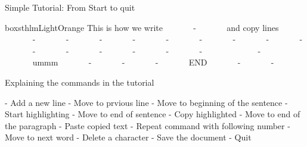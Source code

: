 \documentclass[newPxFont,sthlmFooter,nooffset]{beamer}
\begin{document}
\begin{frame}[containsverbatim,t]{Simple Tutorial: From Start to quit}
\begin{beamercolorbox}[sep=1em,wd=\linewidth]{boxsthlmLightOrange}
{\footnotesize
This is how we write \hfill ~~~~~~ - \hfill~~~~~~  and copy lines \hfill ~~~~~~ - \hfill~~~~~~  -  \hfill~~~~~~   - \hfill~~~~~~    - \hfill~~~~~~    - \hfill~~~~~~    -\keystroke{\}} \hfill~~~~~~    - \hfill~~~~~~    - \hfill~~~~~~    - \hfill~~~~~~    - \hfill~~~~~~    - \hfill~~~~~~   -  \hfill~~~~~~   - \hfill ~~~~~~   -  \hfill~~~~~~   -\keystroke{\}}\hfill~~~~~~    \hfill~~~~~~    - \hfill~~~~~~     \hfill~~~~~~   ummm \hfill~~~~~~   - \hfill~~~~~~    - \hfill~~~~~~    - ~~~~~~   END ~~~~~~   - ~~~~~~ - }
\end{beamercolorbox}

\bigskip
Explaining the commands in the tutorial

\bigskip
{\footnotesize
{}- Add a new line \hfill
{}- Move to prvious line \hfill
{}- Move to beginning of the sentence \hfill
{}- Start highlighting \hfill
{}- Move to end of sentence \hfill
{}- Copy highlighted \hfill
{}-\keystroke{\}} Move to end of the paragraph \hfill
{}- Paste copied text \hfill
{}- Repeat command with following number \hfill
{}- Move to next word \hfill
{}- Delete a character \hfill
{}- Save the document
- Quit
}
\end{frame}
\end{document}

